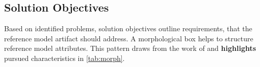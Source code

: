 
\subsection{Solution Objectives}
\label{sec:solobj}


Based on identified problems, solution objectives outline requirements, that the reference model artifact should address. A morphological box helps to structure reference model attributes. This pattern draws from the work of \cite{Puster2015} and \textbf{highlights} pursued characteristics in \Tab \ref{tab:morph}.  

